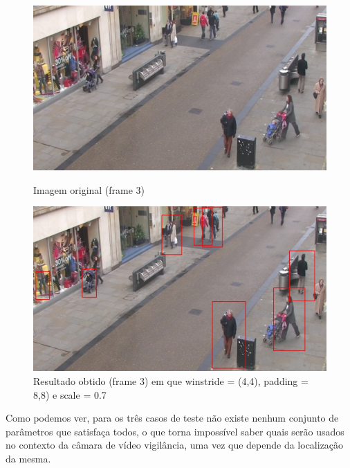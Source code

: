 \begin{figure}[h]
	\centering
	\begin{minipage}[b]{0.49\textwidth}
		\centering
		\includegraphics[width=\textwidth]{img/vision/exemplos/frame3.png}
		\caption[Imagem original (frame 3)]{Imagem original (frame 3) \newline \newline}
		\label{bluetth05-res}
	\end{minipage}
	\hfill
	\begin{minipage}[b]{0.49\textwidth}
		\centering
		\includegraphics[width=\textwidth]{img/vision/exemplos/result_frame3.jpg}
		\caption[Resultado obtido (frame 3)]{Resultado obtido (frame 3) em que winstride = (4,4), padding = 8,8) e scale = 0.7}
		\label{comimageesquema}
	\end{minipage}
\end{figure}



Como podemos ver, para os três casos de teste não existe nenhum conjunto de parâmetros que satisfaça todos, o que torna impossível saber quais serão usados no contexto da câmara de vídeo vigilância, uma vez que depende da localização da mesma.  



